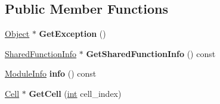 \subsection*{Public Member Functions}
\begin{DoxyCompactItemize}
\item 
\mbox{\label{classv8_1_1internal_1_1Module_a73cc59c26b777eb09080a28a5673d808}} 
\mbox{\hyperlink{classv8_1_1internal_1_1Object}{Object}} $\ast$ {\bfseries Get\+Exception} ()
\item 
\mbox{\label{classv8_1_1internal_1_1Module_aa28874d9ac07760ad157d4a6ba6965c2}} 
\mbox{\hyperlink{classv8_1_1internal_1_1SharedFunctionInfo}{Shared\+Function\+Info}} $\ast$ {\bfseries Get\+Shared\+Function\+Info} () const
\item 
\mbox{\label{classv8_1_1internal_1_1Module_a3b26167a39d14bd3b42a9ce015082a92}} 
\mbox{\hyperlink{classv8_1_1internal_1_1ModuleInfo}{Module\+Info}} {\bfseries info} () const
\item 
\mbox{\label{classv8_1_1internal_1_1Module_ad92e23f84e017ee03d14b1295a80da22}} 
\mbox{\hyperlink{classv8_1_1internal_1_1Cell}{Cell}} $\ast$ {\bfseries Get\+Cell} (\mbox{\hyperlink{classint}{int}} cell\+\_\+index)
\end{DoxyCompactItemize}
